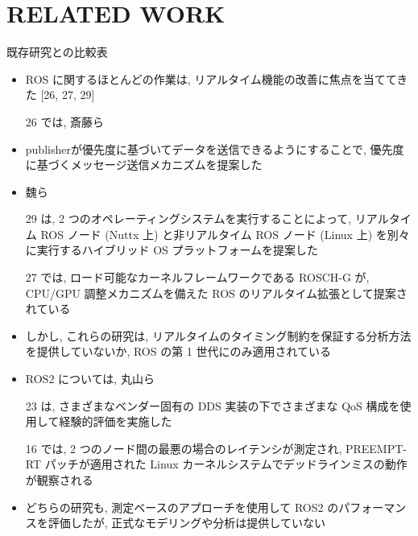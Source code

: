 
\section{RELATED WORK}
\label{sec: related_work}

\begin{frame}{既存研究との比較表}
\end{frame}

\begin{frame}{}
    \begin{itemize}
        \item ROS に関するほとんどの作業は, リアルタイム機能の改善に焦点を当ててきた [26, 27, 29]
\item [26]では, 斎藤ら
\item publisherが優先度に基づいてデータを送信できるようにすることで, 優先度に基づくメッセージ送信メカニズムを提案した
\item 魏ら
\item [29] は, 2 つのオペレーティングシステムを実行することによって, リアルタイム ROS ノード (Nuttx 上) と非リアルタイム ROS ノード (Linux 上) を別々に実行するハイブリッド OS プラットフォームを提案した
\item [27] では, ロード可能なカーネルフレームワークである ROSCH-G が, CPU/GPU 調整メカニズムを備えた ROS のリアルタイム拡張として提案されている
\item しかし, これらの研究は, リアルタイムのタイミング制約を保証する分析方法を提供していないか, ROS の第 1 世代にのみ適用されている
    \end{itemize}
\end{frame}

\begin{frame}{}
    \begin{itemize}
        \item ROS2 については, 丸山ら
\item [23] は, さまざまなベンダー固有の DDS 実装の下でさまざまな QoS 構成を使用して経験的評価を実施した
\item [16] では, 2 つのノード間の最悪の場合のレイテンシが測定され, PREEMPT-RT パッチが適用された Linux カーネルシステムでデッドラインミスの動作が観察される
\item どちらの研究も, 測定ベースのアプローチを使用して ROS2 のパフォーマンスを評価したが, 正式なモデリングや分析は提供していない
    \end{itemize}
\end{frame}

